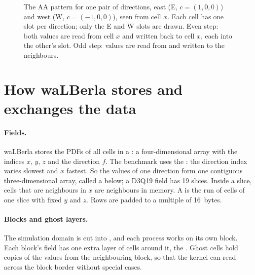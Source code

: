 \begin{figure}[htbp]
  \centering
  \resizebox{\linewidth}{!}{}
  \caption[The AA pattern for one pair of directions]{The AA pattern for one pair of
    directions, east (E, $c = (1,0,0)$) and west (W, $c = (-1,0,0)$), seen from cell $x$.
    Each cell has one slot per direction; only the E and W slots are drawn. Even step: both
    values are read from cell $x$ and written back to cell $x$, each into the other's slot.
    Odd step: values are read from and written to the neighbours.}\label{r03:fig:aa}
\end{figure}

\section{How waLBerla stores and exchanges the data}\label{r03:sec:bg-blocks}

\paragraph{Fields.} waLBerla stores the PDFs of all cells in a : a
four-dimensional array with the indices $x$, $y$, $z$ and the direction $f$. The benchmark
uses the : the direction index varies slowest and $x$ fastest. So the
values of one direction form one contiguous three-dimensional array, called a
 below; a D3Q19 field has 19 slices. Inside a slice, cells that are neighbours
in $x$ are neighbours in memory. A  is the run of cells of one slice with fixed
$y$ and $z$. Rows are padded to a multiple of 16~bytes.

\paragraph{Blocks and ghost layers.} The simulation domain is cut into , and
each process works on its own block. Each block's field has one extra layer of cells
around it, the . Ghost cells hold copies of the values from the
neighbouring block, so that the kernel can read across the block border without special
cases.

